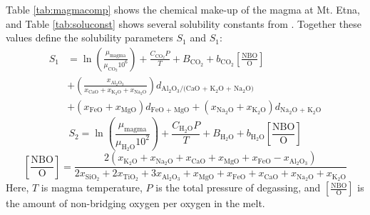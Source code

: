 Table \ref{tab:magmacomp} shows the chemical make-up of the magma at Mt. Etna, and Table \ref{tab:soluconst} shows several solubility constants from \citet{Iacono-Marziano_2012}. Together these values define the solubility parameters $S_1$ and $S_1$:
\begin{equation}
\begin{split}
    {S_1} &= \ln \left(\frac{\mu_\mathrm{magma}}{\mu_\mathrm{CO_2}10^{6}}\right) + \frac{{{C_{{\text{C}}{{\text{O}}_{\text{2}}}}}P}}{T} + {B_{{\text{C}}{{\text{O}}_{\text{2}}}}} + {b_{{\text{C}}{{\text{O}}_{\text{2}}}}}\left[ {\frac{{{\text{NBO}}}}{{\text{O}}}} \right] \\
    &+ \left( {\frac{{{x_{{\text{A}}{{\text{l}}_{\text{2}}}{{\text{O}}_{\text{3}}}}}}}{{{x_{{\text{CaO}}}} + {x_{{{\text{K}}_{\text{2}}}{\text{O}}}} + {x_{{\text{N}}{{\text{a}}_{\text{2}}}{\text{O}}}}}}} \right){d_{{\text{A}}{{\text{l}}_{\text{2}}}{{\text{O}}_{\text{3}}}{\text{/(CaO + }}{{\text{K}}_{\text{2}}}{\text{O + N}}{{\text{a}}_{\text{2}}}{\text{O)}}}}\\
    &+ ({x_{{\text{FeO}}}} + {x_{{\text{MgO}}}}){d_{{\text{FeO + MgO}}}} + ({x_{{\text{N}}{{\text{a}}_{\text{2}}}{\text{O}}}} + {x_{{{\text{K}}_{\text{2}}}{\text{O}}}}){d_{{\text{N}}{{\text{a}}_2}{\text{O + }}{{\text{K}}_2}{\text{O}}}}
\end{split}
\end{equation}
\begin{equation}
    {S_2} = \ln \left(\frac{\mu_\mathrm{magma}}{{\mu_{{{\text{H}}_2}{\text{O}}}}10^2}\right) + \frac{{{C_{{{\text{H}}_2}{\text{O}}}}P}}{T} + {B_{{{\text{H}}_2}{\text{O}}}} + {b_{{{\text{H}}_2}{\text{O}}}}\left[ {\frac{{{\text{NBO}}}}{{\text{O}}}} \right]
\end{equation}
\begin{equation}
    \left[ {\frac{{{\text{NBO}}}}{{\text{O}}}} \right] = \frac{{2({x_{{{\text{K}}_{\text{2}}}{\text{O}}}} + {x_{{\text{N}}{{\text{a}}_{\text{2}}}{\text{O}}}} + {x_{{\text{CaO}}}} + {x_{{\text{MgO}}}} + {x_{{\text{FeO}}}} - {x_{{\text{A}}{{\text{l}}_{\text{2}}}{{\text{O}}_{\text{3}}}}})}}{{2{x_{{\text{Si}}{{\text{O}}_{\text{2}}}}} + 2{x_{{\text{Ti}}{{\text{O}}_{\text{2}}}}} + 3{x_{{\text{A}}{{\text{l}}_{\text{2}}}{{\text{O}}_{\text{3}}}}} + {x_{{\text{MgO}}}} + {x_{{\text{FeO}}}} + {x_{{\text{CaO}}}} + {x_{{\text{N}}{{\text{a}}_{\text{2}}}{\text{O}}}} + {x_{{{\text{K}}_{\text{2}}}{\text{O}}}}}}
\end{equation}
Here, $T$ is magma temperature, $P$ is the total pressure of degassing, and $\left[\frac{\mathrm{NBO}}{\mathrm{O}}\right]$ is the amount of non-bridging oxygen per oxygen in the melt.

